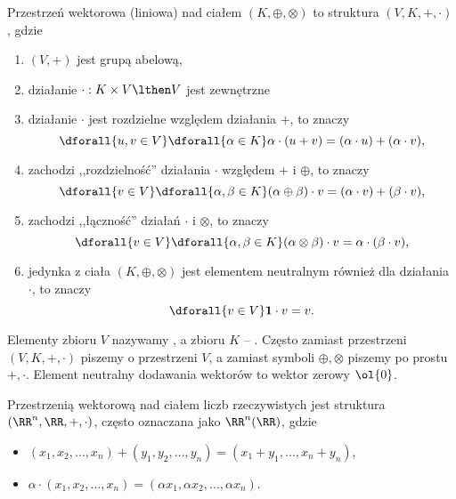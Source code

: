 \begin{definition}
    \label{d:vector_space}
    Przestrzeń wektorowa (liniowa) nad ciałem $(K, \oplus, \otimes)$ to struktura $(V, K, +, \cdot)$, gdzie
    \begin{enumerate}
        \item $(V, +)$ jest grupą abelową,
        \item działanie $\cdot : K \times V \lthen V$ jest zewnętrzne
        \item działanie $\cdot$ jest rozdzielne względem działania $+$, to znaczy
            $$ \dforall{u, v \in V} \dforall{\alpha \in K} \alpha\cdot(u + v) = (\alpha \cdot u) + (\alpha \cdot v), $$
        \item zachodzi ,,rozdzielność'' działania $\cdot$ względem $+$ i $\oplus$, to znaczy
            $$ \dforall{v \in V} \dforall{\alpha, \beta \in K} (\alpha \oplus \beta) \cdot v = (\alpha \cdot v) + (\beta \cdot v), $$
        \item zachodzi ,,łączność'' działań $\cdot$ i $\otimes$, to znaczy
            $$ \dforall{v \in V} \dforall{\alpha, \beta \in K} (\alpha \otimes \beta) \cdot v = \alpha \cdot (\beta \cdot v), $$
        \item jedynka z ciała $(K, \oplus, \otimes)$ jest elementem neutralnym również dla działania $\cdot$, to znaczy
            $$ \dforall{v \in V} \mathbf{1} \cdot v = v. $$
    \end{enumerate}
\end{definition}

Elementy zbioru $V$ nazywamy , a zbioru $K$ -- . Często zamiast przestrzeni $(V, K, +, \cdot)$ piszemy o przestrzeni $V$, a zamiast symboli $\oplus, \otimes$ piszemy po prostu $+, \cdot$. Element neutralny dodawania wektorów to wektor zerowy $\ol{0}$.

\begin{example}
    Przestrzenią wektorową nad ciałem liczb rzeczywistych jest struktura $(\RR^n, \RR, +, \cdot)$, często oznaczana jako $\RR^n(\RR)$, gdzie
    \begin{itemize}[noitemsep,nolistsep]
        \item $(x_1, x_2, \ldots, x_n) + (y_1, y_2, \ldots, y_n) = (x_1 + y_1, \ldots, x_n + y_n)$,
        \item $\alpha \cdot (x_1, x_2, \ldots, x_n) = (\alpha x_1, \alpha x_2, \ldots, \alpha x_n)$.
    \end{itemize}
\end{example}


